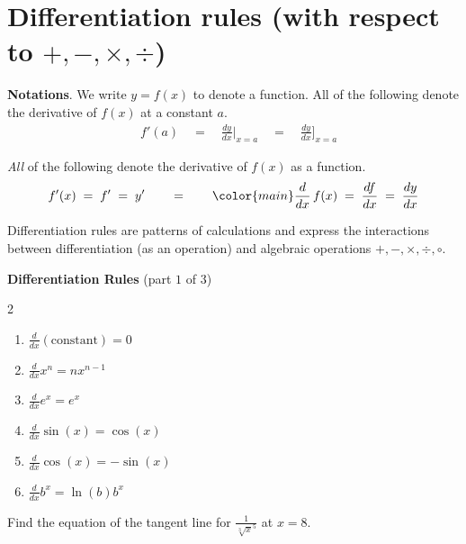 \documentclass[../main.tex]{subfiles}
\begin{document}
 \section{Differentiation rules (with respect to \texorpdfstring{\(+,-,\times,\div\)}{+, -, •, ÷})}

\textbf{Notations}. We write \(y = f(x)\) to denote a function. All of the following denote the derivative of \(f(x)\) at a constant \(a\).
\begin{align*}
  & f'(a) \quad=\quad \frac{dy}{dx} \bigg|_{x = a} \quad=\quad \frac{dy}{dx} \bigg]_{x = a}
\end{align*}


\emph{All} of the following denote the derivative of \(f(x)\) as a function.
\[
  f'(x)
  \;=\; f'
  \;=\; y'
  \qquad =\qquad
  {\color{main} \frac{d}{dx}} \, f(x) \;=\; \frac{df}{dx} \;=\; \frac{dy}{dx}
\]

\bigskip
Differentiation rules are patterns of calculations and express the interactions between differentiation (as an operation) and algebraic operations \(+, -, \times, \div, \circ\).

\begin{mdframed}[style=simple-compact] \label{thm:diff-rules-1}
  \textbf{Differentiation Rules} \hfill {\footnotesize (part \(1\) of \(3\))}
  \begin{multicols}{2}
    \begin{enumerate}[label=(\arabic*)]
      \item \(\frac{d}{dx} (\text{constant}) = 0\)
      \item \(\frac{d}{dx} x^{n} = n x^{n-1}\)
      \item \(\frac{d}{dx} e^{x} = e^{x}\)
      \item \(\frac{d}{dx} \sin(x) = \cos(x)\)
      \item \(\frac{d}{dx} \cos(x) = -\sin(x)\)
      \item \(\frac{d}{dx} b^{x} = \ln(b)b^{x}\)
    \end{enumerate}
  \end{multicols}
\end{mdframed}

\begin{example}
  Find the equation of the tangent line for \(\frac{1}{\sqrt[3]{x}^{5}}\) at \(x = 8\).

\end{example}
\clearpage
\label{page:higher-derivatives}
\end{document}
